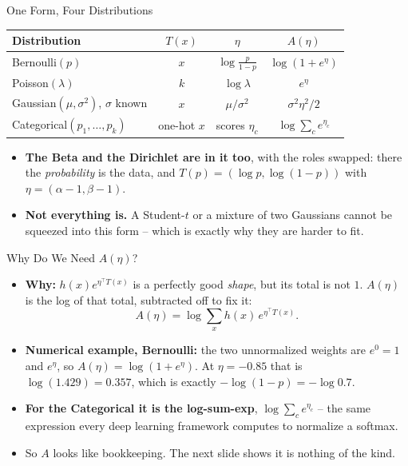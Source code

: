\begin{frame}{One Form, Four Distributions}
\footnotesize
\centering
\begin{tabular}{l|ccc}
Distribution & $T(x)$ & $\eta$ & $A(\eta)$ \\
\hline
Bernoulli$(p)$ & $x$ & $\log\frac{p}{1-p}$ & $\log(1+e^{\eta})$ \\[2pt]
Poisson$(\lambda)$ & $k$ & $\log \lambda$ & $e^{\eta}$ \\[2pt]
Gaussian$(\mu,\sigma^2)$, $\sigma$ known & $x$ & $\mu/\sigma^{2}$ & $\sigma^{2}\eta^{2}/2$ \\[2pt]
Categorical$(p_1,\dots,p_k)$ & one-hot $x$ & scores $\eta_c$ & $\log\sum_c e^{\eta_c}$ \\
\end{tabular}

\vspace{0.6em}
\raggedright
\begin{itemize}
  \item \textbf{The Beta and the Dirichlet are in it too}, with the roles swapped: there the \emph{probability} is the data, and $T(p) = (\log p, \log(1-p))$ with $\eta = (\alpha-1, \beta-1)$.
  \pause
  \item \textbf{Not everything is.} A Student-$t$ or a mixture of two Gaussians cannot be squeezed into this form -- which is exactly why they are harder to fit.
\end{itemize}
\end{frame}

\begin{frame}{Why Do We Need $A(\eta)$?}
\begin{itemize}
  \item \textbf{Why:} $h(x)e^{\eta^{\top}T(x)}$ is a perfectly good \emph{shape}, but its total is not $1$. $A(\eta)$ is the log of that total, subtracted off to fix it:
  \[
    A(\eta) = \log \sum_{x} h(x)\,e^{\eta^{\top}T(x)} .
  \]
  \pause
  \item \textbf{Numerical example, Bernoulli:} the two unnormalized weights are $e^{0}=1$ and $e^{\eta}$, so $A(\eta)=\log(1+e^{\eta})$. At $\eta = -0.85$ that is $\log(1.429) = 0.357$, which is exactly $-\log(1-p) = -\log 0.7$.
  \pause
  \item \textbf{For the Categorical it is the log-sum-exp}, $\log\sum_c e^{\eta_c}$ -- the same expression every deep learning framework computes to normalize a softmax.
  \pause
  \item So $A$ looks like bookkeeping. The next slide shows it is nothing of the kind.
\end{itemize}
\end{frame}

